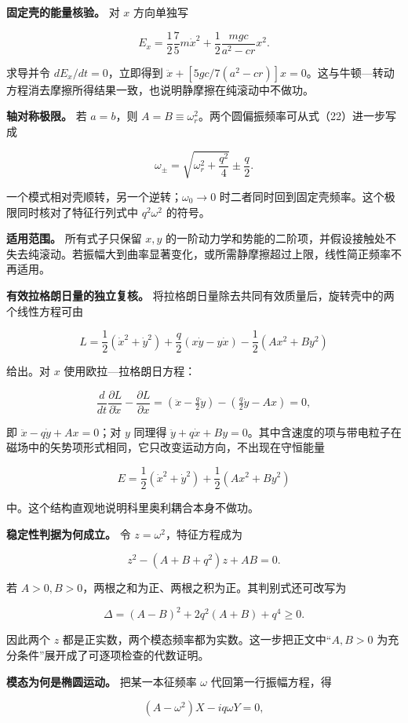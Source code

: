 \documentclass[12pt,a4paper,UTF8]{ctexart}
\begin{document}
\textbf{固定壳的能量核验。} 对 \(x\) 方向单独写

\[
E_x=\frac12\frac75m\dot x^2
+\frac12\frac{mgc}{a^2-cr}x^2.
\]

求导并令 \(dE_x/dt=0\)，立即得到
\(\ddot x+[5gc/7(a^2-cr)]x=0\)。这与牛顿---转动方程消去摩擦所得结果一致，也说明静摩擦在纯滚动中不做功。

\textbf{轴对称极限。} 若 \(a=b\)，则
\(A=B\equiv\omega_r^2\)。两个圆偏振频率可从式（22）进一步写成

\[
\omega_\pm
=\sqrt{\omega_r^2+\frac{q^2}{4}}
\pm\frac q2.
\]

一个模式相对壳顺转，另一个逆转；\(\omega_0\to0\)
时二者同时回到固定壳频率。这个极限同时核对了特征行列式中 \(q^2\omega^2\)
的符号。

\textbf{适用范围。} 所有式子只保留 \(x,y\)
的一阶动力学和势能的二阶项，并假设接触处不失去纯滚动。若振幅大到曲率显著变化，或所需静摩擦超过上限，线性简正频率不再适用。

\textbf{有效拉格朗日量的独立复核。}
将拉格朗日量除去共同有效质量后，旋转壳中的两个线性方程可由

\[
L=\frac12(\dot x^2+\dot y^2)
+\frac q2(x\dot y-y\dot x)
-\frac12(Ax^2+By^2)
\]

给出。对 \(x\) 使用欧拉---拉格朗日方程：

\[
\frac{d}{dt}\frac{\partial L}{\partial\dot x}
-\frac{\partial L}{\partial x}
=(\ddot x-\tfrac q2\dot y)
-(\tfrac q2\dot y-Ax)=0,
\]

即 \(\ddot x-q\dot y+Ax=0\)；对 \(y\) 同理得
\(\ddot y+q\dot x+By=0\)。其中含速度的项与带电粒子在磁场中的矢势项形式相同，它只改变运动方向，不出现在守恒能量

\[
E=\frac12(\dot x^2+\dot y^2)
+\frac12(Ax^2+By^2)
\]

中。这个结构直观地说明科里奥利耦合本身不做功。

\textbf{稳定性判据为何成立。} 令 \(z=\omega^2\)，特征方程成为

\[
z^2-(A+B+q^2)z+AB=0.
\]

若 \(A>0,B>0\)，两根之和为正、两根之积为正。其判别式还可改写为

\[
\Delta=(A-B)^2+2q^2(A+B)+q^4\ge0.
\]

因此两个 \(z\)
都是正实数，两个模态频率都为实数。这一步把正文中``\(A,B>0\)
为充分条件''展开成了可逐项检查的代数证明。

\textbf{模态为何是椭圆运动。} 把某一本征频率 \(\omega\)
代回第一行振幅方程，得

\[
(A-\omega^2)X-iq\omega Y=0,
\]
\end{document}
